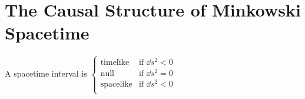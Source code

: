 \section{The Causal Structure of Minkowski Spacetime}

A spacetime interval is
\begin{math}
    \begin{cases}
        \text{timelike} & \text{if $\dd s^2 < 0$} \\
        \text{null} & \text{if $\dd s^2 = 0$} \\
        \text{spacelike} & \text{if $\dd s^2 < 0$} \\
    \end{cases}
\end{math}

